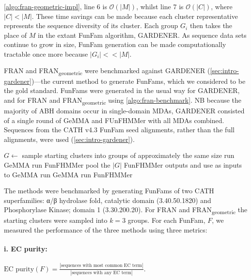 \ref{algo:fran-geometric-impl}, line 6 is $\mathcal{O}(|M|)$, whilst line 7 is $\mathcal{O}(|C|)$, where $|C| < |M|$. These time savings can be made because each cluster representative represents the sequence diversity of its cluster. Each group $G_i$ then takes the place of $M$ in the extant FunFam algorithm, GARDENER. As sequence data sets continue to grow in size, FunFam generation can be made computationally tractable once more because $|G_i| << |M|$.

FRAN and FRAN\textsubscript{geometric} were benchmarked against GARDENER (\ref{sec:intro-gardener})---the current method to generate FunFams, which we considered to be the gold standard. FunFams were generated in the usual way for GARDENER, and for FRAN and FRAN\textsubscript{geometric} using \ref{algo:fran-benchmark}. NB because the majority of ABH domains occur in single-domain MDAs, GARDENER consisted of a single round of GeMMA and FUnFHMMer with all MDAs combined. Sequences from the CATH v4.3 FunFam seed alignments, rather than the full alignments, were used (\ref{sec:intro-gardener}).

\begin{algorithm}[hbt!]
    \caption{%
        FRAN and FRAN\textsubscript{geometric} benchmark.
    }
    \label{algo:fran-benchmark}
    \begin{algorithmic}[1]
    \Procedure{}{}
        \State $G \gets$ sample starting clusters into groups of approximately the same size
            \State run GeMMA
            \State run FunFHMMer
        \EndFor
        \State pool the $|G|$ FunFHMMer outputs and use as inputs to GeMMA
        \State run GeMMA
        \State run FunFHMMer
    \EndProcedure
    \end{algorithmic}
\end{algorithm}

The methods were benchmarked by generating FunFams of two CATH superfamilies: α/β hydrolase fold, catalytic domain (3.40.50.1820) and Phosphorylase Kinase; domain 1 (3.30.200.20). For FRAN and FRAN\textsubscript{geometric} the starting clusters were sampled into $k=3$ groups. For each FunFam, $F$, we measured the performance of the three methods using three metrics:

\paragraph{i. EC purity:}
$\text{EC purity}(F) = \frac{|\text{sequences with most common EC term}|}{|\text{sequences with any EC term}|}.$

